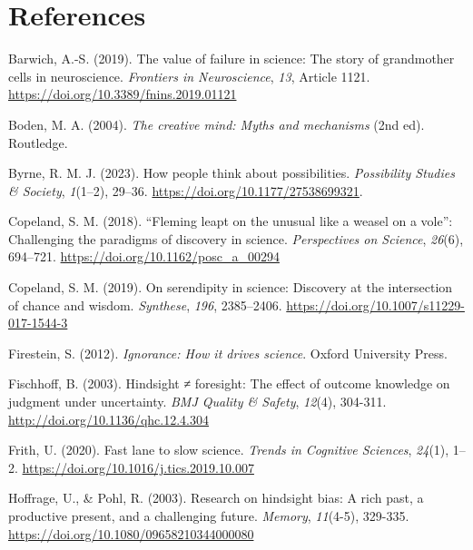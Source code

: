 \documentclass[authordate, commentary]{jote-new-article}
\begin{document}
  





	\section{References}







	Barwich, A.-S. (2019). The value of failure in science: The story of grandmother cells in neuroscience. \emph{Frontiers in Neuroscience}, \emph{13}, Article 1121. \url{https://doi.org/10.3389/fnins.2019.01121}



	Boden, M. A. (2004). \emph{The creative mind: Myths and mechanisms} (2nd ed). Routledge.



	Byrne, R. M. J. (2023). How people think about possibilities. \emph{Possibility Studies \& Society}, \emph{1}(1--2), 29--36. \url{https://doi.org/10.1177/27538699321}.



	Copeland, S. M. (2018). “Fleming leapt on the unusual like a weasel on a vole”: Challenging the paradigms of discovery in science. \emph{Perspectives on Science}, \emph{26}(6), 694--721. \url{https://doi.org/10.1162/posc\_a\_00294}



	Copeland, S. M. (2019). On serendipity in science: Discovery at the intersection of chance and wisdom. \emph{Synthese}, \emph{196}, 2385--2406. \url{https://doi.org/10.1007/s11229-017-1544-3}



	Firestein, S. (2012). \emph{Ignorance: How it drives science}. Oxford University Press.



	Fischhoff, B. (2003). Hindsight ≠ foresight: The effect of outcome knowledge on judgment under uncertainty. \emph{BMJ Quality \& Safety}, \emph{12}(4), 304-311. \url{http://doi.org/10.1136/qhc.12.4.304}
	
	Frith, U. (2020). Fast lane to slow science. \emph{Trends in Cognitive Sciences}, \emph{24}(1), 1--2. \url{https://doi.org/10.1016/j.tics.2019.10.007}



	Hoffrage, U., \& Pohl, R. (2003). Research on hindsight bias: A rich past, a productive present, and a challenging future. \emph{Memory}, \emph{11}(4-5), 329-335. \url{https://doi.org/10.1080/09658210344000080}
\end{document}
